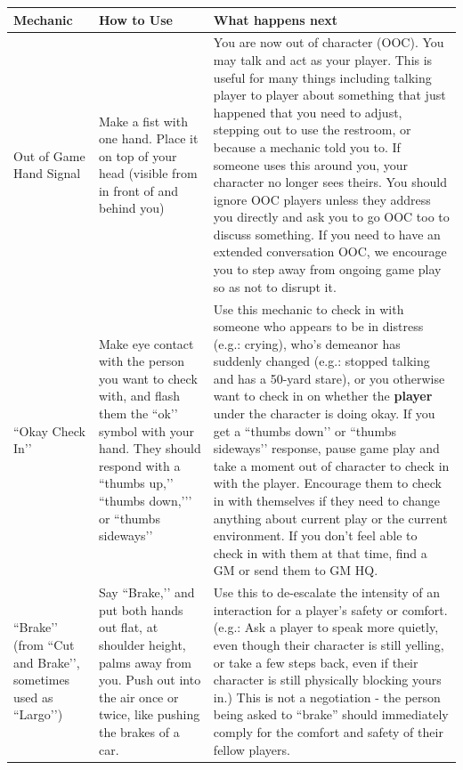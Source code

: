 \documentclass[sheet]{GL2020}
\begin{document}
\begin{tabularx}{\textwidth}{|>{\centering\arraybackslash} m{1.5cm} | >{\centering\arraybackslash} m{2.5cm} | >{\centering\arraybackslash}X |}
\hline 
 \textbf{Mechanic} & \textbf{How to Use} & \textbf{What happens next} \\
\hline
Out of Game Hand Signal & Make a fist with one hand. Place it on top of your head (visible from in front of and behind you) & You are now out of character (OOC). You may talk and act as your player. This is useful for many things including talking player to player about something that just happened that you need to adjust, stepping out to use the restroom, or because a mechanic told you to. If someone uses this around you, your character no longer sees theirs. You should ignore OOC players unless they address you directly and ask you to go OOC too to discuss something. If you need to have an extended conversation OOC, we encourage you to step away from ongoing game play so as not to disrupt it. \\
    \hline
``Okay Check In’’ & Make eye contact with the person you want to check with, and flash them the ``ok’’ symbol with your hand. They should respond with a ``thumbs up,’’ ``thumbs down,’’’ or ``thumbs sideways’’ & Use this mechanic to check in with someone who appears to be in distress (e.g.: crying), who’s demeanor has suddenly changed (e.g.: stopped talking and has a 50-yard stare), or you otherwise want to check in on whether the \textbf{player} under the character is doing okay. If you get a ``thumbs down’’ or ``thumbs sideways’’ response, pause game play and take a moment out of character to check in with the player. Encourage them to check in with themselves if they need to change anything about current play or the current environment. If you don’t feel able to check in with them at that time, find a GM or send them to GM HQ.\\
    \hline
``Brake’’ (from ``Cut and Brake’’, sometimes used as ``Largo’’) & Say ``Brake,’’ and put both hands out flat, at shoulder height, palms away from you. Push out into the air once or twice, like pushing the brakes of a car. & Use this to de-escalate the intensity of an interaction for a player’s safety or comfort. (e.g.: Ask a player to speak more quietly, even though their character is still yelling, or take a few steps back, even if their character is still physically blocking yours in.) This is not a negotiation - the person being asked to ``brake'' should immediately comply for the comfort and safety of their fellow players. \\

\end{tabularx}
\end{document}
